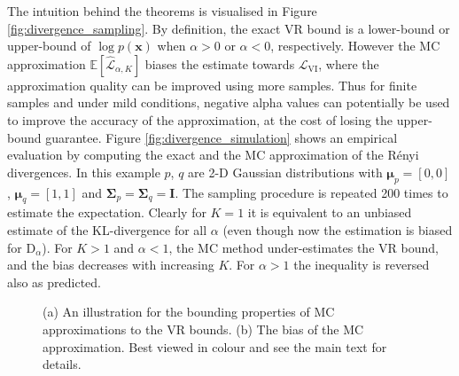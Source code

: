 %
The intuition behind the theorems is visualised in Figure \ref{fig:divergence_sampling}. By definition, the exact VR bound is a lower-bound or upper-bound of $\log p(\bm{x})$ when $\alpha > 0$ or $\alpha < 0$, respectively. However the MC approximation $\mathbb{E}[\hat{\mathcal{L}}_{\alpha, K}]$ biases the estimate towards $\mathcal{L}_{\text{VI}}$, where the approximation quality can be improved using more samples. Thus for finite samples and under mild conditions, negative alpha values can potentially be used to improve the accuracy of the approximation, at the cost of losing the upper-bound guarantee.
%
Figure \ref{fig:divergence_simulation} shows an empirical evaluation by computing the exact and the MC approximation of the R{\'e}nyi divergences. In this example $p$, $q$ are 2-D Gaussian distributions with $\bm{\mu}_p = [0, 0]$, $\bm{\mu}_q = [1, 1]$ and $\bm{\Sigma}_p = \bm{\Sigma}_q = \bm{I}$. The sampling procedure is repeated 200 times to estimate the expectation. Clearly for $K = 1$ it is equivalent to an unbiased estimate of the KL-divergence for all $\alpha$ (even though now the estimation is biased for $\mathrm{D}_{\alpha}$). For $K > 1$ and $\alpha < 1$, the MC method under-estimates the VR bound, and the bias decreases with increasing $K$. For $\alpha > 1$ the inequality is reversed also as predicted.


\begin{figure}[t]
 \centering
 \hspace{0.1in}
 \vspace{-0.1in}
 \caption{(a) An illustration for the bounding properties of MC approximations to the VR bounds. (b) The bias of the MC approximation. Best viewed in colour and see the main text for details.}
\end{figure}

